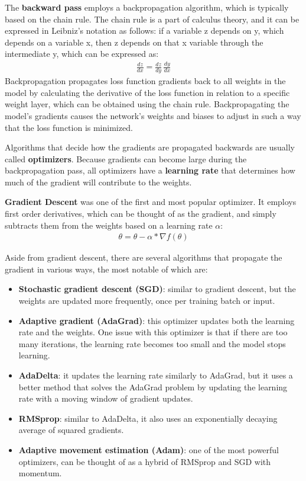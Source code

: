 \documentclass{report}[12pt, a4paper]
\begin{document}
The \textbf{backward pass} employs a backpropagation algorithm, which is typically based on the chain rule. The chain rule is a part of calculus theory, and it can be expressed in Leibniz's notation as follows: if a variable z depends on y, which depends on a variable x, then z depends on that x variable through the intermediate y, which can be expressed as:
\begin{align*}
    \frac {dz}{dx} = \frac {dz}{dy} \, \frac {dy}{dx}
\end{align*}
Backpropagation propagates loss function gradients back to all weights in the model by calculating the derivative of the loss function in relation to a specific weight layer, which can be obtained using the chain rule. Backpropagating the model's gradients causes the network's weights and biases to adjust in such a way that the loss function is minimized.

Algorithms that decide how the gradients are propagated backwards are usually called \textbf{optimizers}. Because gradients can become large during the backpropagation pass, all optimizers have a \textbf{learning rate} that determines how much of the gradient will contribute to the weights.

 \textbf{Gradient Descent} was one of the first and most popular optimizer. It employs first order derivatives, which can be thought of as the gradient, and simply subtracts them from the weights based on a learning rate $\alpha$:
\begin{align*}
    \theta = \theta - \alpha * \nabla f(\theta)
\end{align*}

Aside from gradient descent, there are several algorithms that propagate the gradient in various ways, the most notable of which are:
\begin{itemize}
    \item \textbf{Stochastic gradient descent (SGD)}: similar to gradient descent, but the weights are updated more frequently, once per training batch or input.
    \item \textbf{Adaptive gradient (AdaGrad)}: this optimizer updates both the learning rate and the weights. One issue with this optimizer is that if there are too many iterations, the learning rate becomes too small and the model stops learning.
    \item \textbf{AdaDelta}: it updates the learning rate similarly to AdaGrad, but it uses a better method that solves the AdaGrad problem by updating the learning rate with a moving window of gradient updates.
    \item \textbf{RMSprop}: similar to AdaDelta, it also uses an exponentially decaying average of squared gradients.
    \item \textbf{Adaptive movement estimation (Adam)}: one of the most powerful optimizers, can be thought of as a hybrid of RMSprop and SGD with momentum.
\end{itemize}
\end{document}
